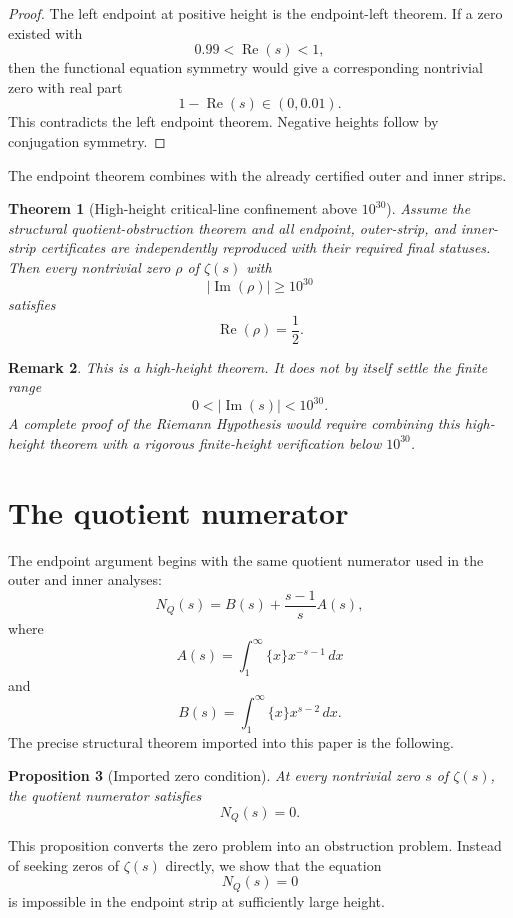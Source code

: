\documentclass[11pt]{article}
\newtheorem{theorem}{Theorem}[section]
\newtheorem{proposition}[theorem]{Proposition}
\newtheorem{remark}[theorem]{Remark}
\DeclareMathOperator{\Rea}{Re}
\DeclareMathOperator{\Ima}{Im}
\newcommand{\NQ}{N_Q}
\begin{document}
\begin{proof}
The left endpoint at positive height is the endpoint-left theorem.  If a zero existed with
\[
0.99<\Rea(s)<1,
\]
then the functional equation symmetry would give a corresponding nontrivial zero with real part
\[
1-\Rea(s)\in(0,0.01).
\]
This contradicts the left endpoint theorem.  Negative heights follow by conjugation symmetry.
\end{proof}

The endpoint theorem combines with the already certified outer and inner strips.

\begin{theorem}[High-height critical-line confinement above \(10^{30}\)]
Assume the structural quotient-obstruction theorem and all endpoint, outer-strip, and inner-strip certificates are independently reproduced with their required final statuses.  Then every nontrivial zero \(\rho\) of \(\zeta(s)\) with
\[
|\Ima(\rho)|\geq 10^{30}
\]
satisfies
\[
\Rea(\rho)=\frac12.
\]
\end{theorem}

\begin{remark}
This is a high-height theorem.  It does not by itself settle the finite range
\[
0<|\Ima(s)|<10^{30}.
\]
A complete proof of the Riemann Hypothesis would require combining this high-height theorem with a rigorous finite-height verification below \(10^{30}\).
\end{remark}

\section{The quotient numerator}

The endpoint argument begins with the same quotient numerator used in the outer and inner analyses:
\[
\NQ(s)=B(s)+\frac{s-1}{s}A(s),
\]
where
\[
A(s)=\int_1^\infty \{x\}x^{-s-1}\,dx
\]
and
\[
B(s)=\int_1^\infty \{x\}x^{s-2}\,dx.
\]
The precise structural theorem imported into this paper is the following.

\begin{proposition}[Imported zero condition]
At every nontrivial zero \(s\) of \(\zeta(s)\), the quotient numerator satisfies
\[
\NQ(s)=0.
\]
\end{proposition}

This proposition converts the zero problem into an obstruction problem.  Instead of seeking zeros of \(\zeta(s)\) directly, we show that the equation
\[
\NQ(s)=0
\]
is impossible in the endpoint strip at sufficiently large height.
\end{document}
